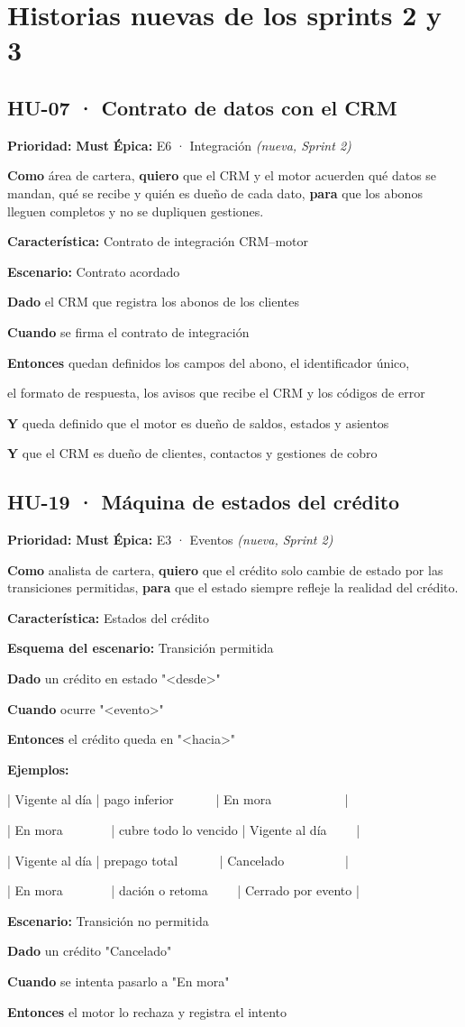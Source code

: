 \documentclass[11pt,a4paper]{article}
\newcommand{\kw}[1]{\textbf{\color{primario}#1}}
\newcommand{\nv}[1]{\par\hspace*{#1em}}
\newcommand{\hu}[5]{%
  \subsection*{#1 · #2}
  \noindent\textbf{Prioridad:} #3 \quad\textbf{Épica:} #4\par\smallskip
  \noindent #5\par\smallskip}
\newcommand{\como}[3]{\textbf{Como} #1, \textbf{quiero} #2, \textbf{para} #3.}
\newcommand{\must}{\colorbox{alerta}{\color{white}\textbf{\small Must}}}
\begin{document}
\section{Historias nuevas de los sprints 2 y 3}

\hu{HU-07}{Contrato de datos con el CRM}{\must}{E6 · Integración \textit{(nueva, Sprint 2)}}{%
\como{área de cartera}{que el CRM y el motor acuerden qué datos se mandan, qué se recibe y quién es dueño de cada dato}{que los abonos lleguen completos y no se dupliquen gestiones}}
\begin{gherkin}
\kw{Característica:} Contrato de integración CRM–motor
\nv{1}\kw{Escenario:} Contrato acordado
\nv{2}\kw{Dado} el CRM que registra los abonos de los clientes
\nv{2}\kw{Cuando} se firma el contrato de integración
\nv{2}\kw{Entonces} quedan definidos los campos del abono, el identificador único,
\nv{2}el formato de respuesta, los avisos que recibe el CRM y los códigos de error
\nv{2}\kw{Y} queda definido que el motor es dueño de saldos, estados y asientos
\nv{2}\kw{Y} que el CRM es dueño de clientes, contactos y gestiones de cobro
\end{gherkin}

\hu{HU-19}{Máquina de estados del crédito}{\must}{E3 · Eventos \textit{(nueva, Sprint 2)}}{%
\como{analista de cartera}{que el crédito solo cambie de estado por las transiciones permitidas}{que el estado siempre refleje la realidad del crédito}}
\begin{gherkin}
\kw{Característica:} Estados del crédito
\nv{1}\kw{Esquema del escenario:} Transición permitida
\nv{2}\kw{Dado} un crédito en estado "<desde>"
\nv{2}\kw{Cuando} ocurre "<evento>"
\nv{2}\kw{Entonces} el crédito queda en "<hacia>"
\nv{2}\kw{Ejemplos:}
\nv{3}| Vigente al día | pago inferior \ \ \ \ \ \ | En mora \ \ \ \ \ \ \ \ \ \ \ |
\nv{3}| En mora \ \ \ \ \ \ \ | cubre todo lo vencido | Vigente al día \ \ \ \ |
\nv{3}| Vigente al día | prepago total \ \ \ \ \ \ | Cancelado \ \ \ \ \ \ \ \ \ |
\nv{3}| En mora \ \ \ \ \ \ \ | dación o retoma \ \ \ \ | Cerrado por evento |
\nv{1}\kw{Escenario:} Transición no permitida
\nv{2}\kw{Dado} un crédito "Cancelado"
\nv{2}\kw{Cuando} se intenta pasarlo a "En mora"
\nv{2}\kw{Entonces} el motor lo rechaza y registra el intento
\end{gherkin}
\end{document}
